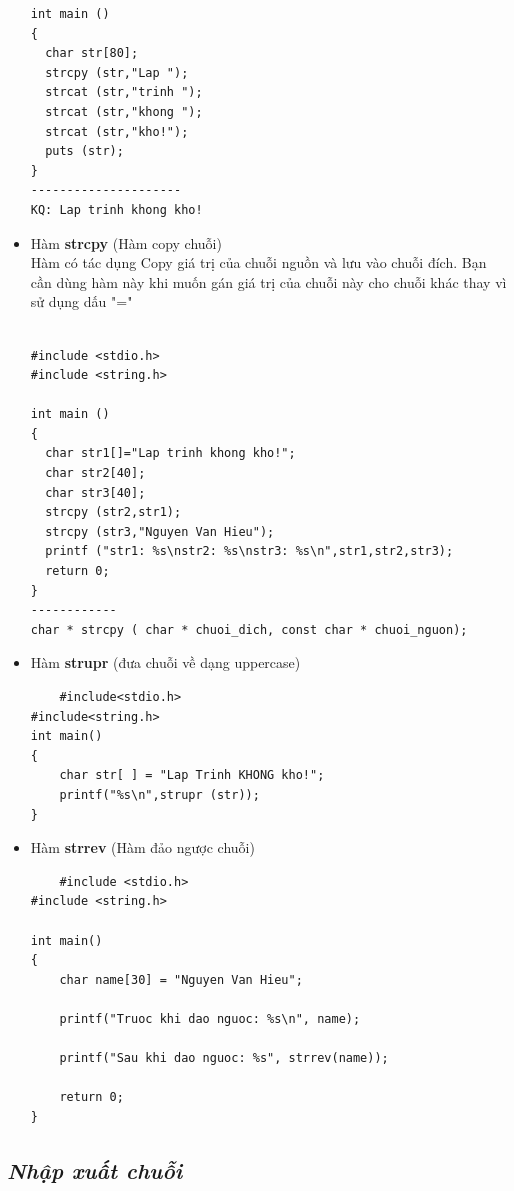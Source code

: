 \documentclass[12pt,a4paper]{article}
\begin{document}
\begin{itemize}
\begin{lstlisting}
int main ()
{
  char str[80];
  strcpy (str,"Lap ");
  strcat (str,"trinh ");
  strcat (str,"khong ");
  strcat (str,"kho!");
  puts (str);
}
---------------------
KQ: Lap trinh khong kho!
\end{lstlisting}
	\item Hàm \textbf{strcpy} (Hàm copy chuỗi)\\ Hàm có tác dụng Copy giá trị của chuỗi nguồn và lưu vào chuỗi đích. Bạn cần dùng hàm này khi muốn gán giá trị của chuỗi này cho chuỗi khác thay vì sử dụng dấu "="
\begin{lstlisting}

#include <stdio.h>
#include <string.h>
 
int main ()
{
  char str1[]="Lap trinh khong kho!";
  char str2[40];
  char str3[40];
  strcpy (str2,str1);
  strcpy (str3,"Nguyen Van Hieu");
  printf ("str1: %s\nstr2: %s\nstr3: %s\n",str1,str2,str3);
  return 0;
}
------------
char * strcpy ( char * chuoi_dich, const char * chuoi_nguon);
\end{lstlisting}
	\item Hàm \textbf{strupr} (đưa chuỗi về dạng uppercase)
\begin{lstlisting}
	#include<stdio.h>
#include<string.h>
int main()
{
    char str[ ] = "Lap Trinh KHONG kho!";
    printf("%s\n",strupr (str));
}

\end{lstlisting}
	\item Hàm \textbf{strrev} (Hàm đảo ngược chuỗi)
\begin{lstlisting}
	#include <stdio.h>
#include <string.h>
 
int main()
{
    char name[30] = "Nguyen Van Hieu";
 
    printf("Truoc khi dao nguoc: %s\n", name);
 
    printf("Sau khi dao nguoc: %s", strrev(name));
 
    return 0;
}
\end{lstlisting}
\end{itemize}
\begin{center}
\subsection*{\textit{Nhập xuất chuỗi}} 	
\end{center}
\end{document}
